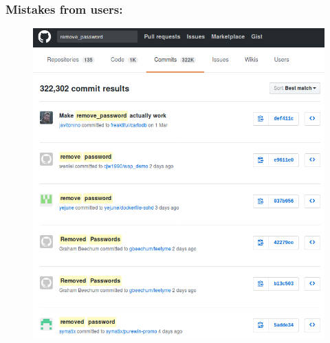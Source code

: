 \documentclass[aspectratio=169]{beamer}
\begin{document}
\begin{frame}
    \frametitle{Mistakes from users:}
        \begin{figure}
            \includegraphics[scale=0.4]{images/git-pass.png}
        \end{figure}
\end{frame}
\end{document}
